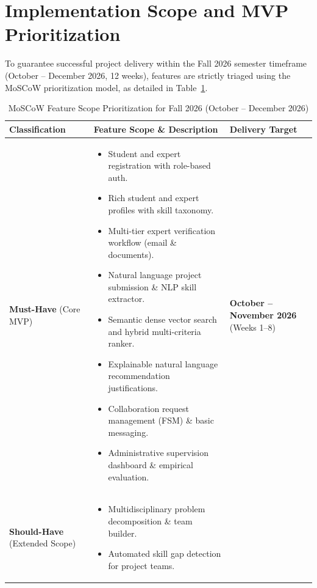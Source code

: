 \documentclass[11pt,a4paper]{article}
\begin{document}
\section[Implementation Scope \& MoSCoW]{Implementation Scope and MVP Prioritization}

To guarantee successful project delivery within the Fall 2026 semester timeframe (October -- December 2026, 12 weeks), features are strictly triaged using the MoSCoW prioritization model, as detailed in Table~\ref{tab:moscow}.

\begin{table}[H]
\centering
\small
\caption{MoSCoW Feature Scope Prioritization for Fall 2026 (October -- December 2026)}
\label{tab:moscow}
\begin{tabularx}{\textwidth}{@{}p{2.8cm} X p{3.2cm}@{}}
\toprule
\textbf{Classification} & \textbf{Feature Scope \& Description} & \textbf{Delivery Target} \\
\midrule
\textbf{Must-Have} \newline (Core MVP) & 
\begin{itemize}[leftmargin=*,noitemsep]
    \item Student and expert registration with role-based auth.
    \item Rich student and expert profiles with skill taxonomy.
    \item Multi-tier expert verification workflow (email \& documents).
    \item Natural language project submission \& NLP skill extractor.
    \item Semantic dense vector search and hybrid multi-criteria ranker.
    \item Explainable natural language recommendation justifications.
    \item Collaboration request management (FSM) \& basic messaging.
    \item Administrative supervision dashboard \& empirical evaluation.
\end{itemize} & \textbf{October -- November 2026} \newline (Weeks 1--8) \\
\addlinespace
\textbf{Should-Have} \newline (Extended Scope) & 
\begin{itemize}[leftmargin=*,noitemsep]
    \item Multidisciplinary problem decomposition \& team builder.
    \item Automated skill gap detection for project teams.

\end{itemize}
\end{tabularx}
\end{table}
\end{document}
